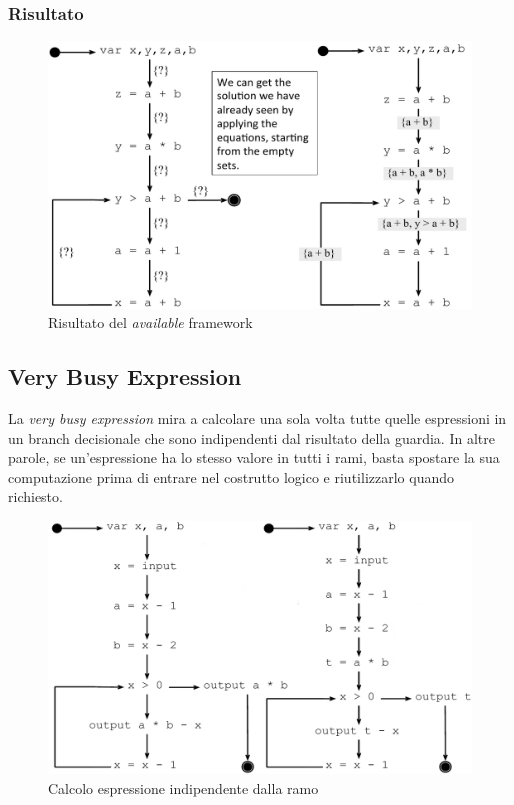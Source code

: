 \subsubsection{Risultato}
\begin{figure}[H]
  \centering
  \includegraphics[scale=0.4]{res/image/example_available}
  \caption{Risultato del \textit{available} framework}
  \label{img:example_available}
\end{figure}

\subsection{Very Busy Expression}
La \textit{very busy expression} mira a calcolare una sola volta tutte quelle
espressioni in un branch decisionale che sono indipendenti dal risultato della
guardia. In altre parole, se un'espressione ha lo stesso valore in tutti i
rami, basta spostare la sua computazione prima di entrare nel costrutto logico
e riutilizzarlo quando richiesto.

\begin{figure}[H]
  \centering
  \includegraphics[scale=0.4]{res/image/indipendent_path}
  \caption{Calcolo espressione indipendente dalla ramo}
  \label{img:indipendent_path}
\end{figure}

